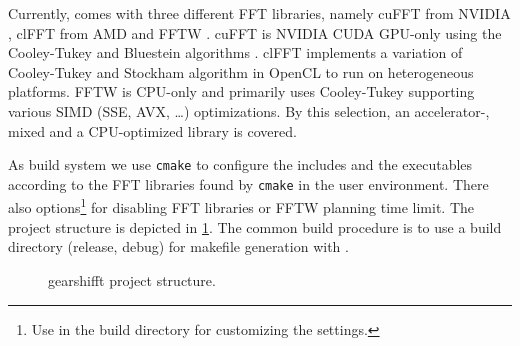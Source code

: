Currently, \gearshifft{} comes with three different FFT libraries, namely cuFFT from NVIDIA \cite{nvidia2010cufft}, clFFT from AMD \cite{clfft} and FFTW \cite{FFTW97, FFTW05}.
cuFFT is NVIDIA CUDA GPU-only using the Cooley-Tukey and Bluestein algorithms \cite{cooley65,bluestein}.
clFFT implements a variation of Cooley-Tukey and Stockham algorithm in OpenCL to run on heterogeneous platforms.
FFTW is CPU-only and primarily uses Cooley-Tukey supporting various SIMD (SSE, AVX, \ldots) optimizations.
By this selection, an accelerator-, mixed and a CPU-optimized library is covered.

As build system we use \texttt{cmake} to configure the includes and the executables according to the FFT libraries found by \texttt{cmake} in the user environment. There also options\footnote{Use  in the build directory for customizing the settings.} for disabling FFT libraries or FFTW planning time limit. The project structure is depicted in \cref{fig:projstruct}. The common build procedure is to use a build directory (release, debug) for makefile generation with .

\begin{figure}[htp]
 \caption{gearshifft project structure.}
 \label{fig:projstruct}
\end{figure}



